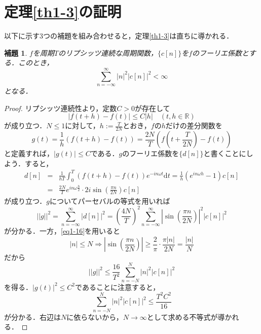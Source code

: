 \documentclass[a4j]{jsbook}
\newtheorem{lemma}[theorem]{補題}
\numberwithin{theorem}{chapter}  %
\begin{document}
\section{定理\ref{th1-3}の証明} \label{sec1-10}
以下に示す3つの補題を組み合わせると，定理\ref{th1-3}は直ちに導かれる．
\begin{lemma}
\label{lem1-10}
\(f\)を周期\(T\)のリプシッツ連続な周期関数，\(\{c[n]\}\)を\(f\)のフーリエ係数とする．このとき，
\begin{equation*}
    \sum_{n=-\infty}^\infty|n|^2\left|c[n]\right|^2<\infty
\end{equation*}
となる．
\end{lemma}
\begin{proof}
リプシッツ連続性より，定数\(C>0\)が存在して
\begin{equation*}
    |f(t+h)-f(t)|\leq C|h|\quad (t, h\in\mathbb{R})
\end{equation*}
が成り立つ．\(N\leq 1\)に対して，\(\displaystyle h:=\frac{T}{2N}\)とおき，\(f\)の\(h\)だけの差分関数を
\begin{equation*}
    g(t)=\frac{1}{h}(f(t+h)-f(t))=\frac{2N}{T}\left(f\left(t+\frac{T}{2N}\right)-f(t)\right)
\end{equation*}
と定義すれば，\(|g(t)|\leq C\)である．\(g\)のフーリエ係数を\(\{d[n]\}\)と書くことにしよう．すると，
\begin{eqnarray*}
d[n]&=&\frac{1}{hT}\int_0^T (f(t+h)-f(t))e^{-in\omega t}\mathrm{d}t=\frac{1}{h}(e^{in\omega h}-1)c[n] \\
&=&\frac{2N}{T}e^{in\omega\frac{h}{2}}\cdot 2i\sin\left(\frac{\pi n}{2N}\right)c[n]
\end{eqnarray*}
が成り立つ．\(g\)についてパーセバルの等式を用いれば
\begin{equation*}
    ||g||^2=\sum_{n=-\infty}^\infty\left|d[n]\right|^2=\left(\frac{4N}{T}\right)^2\sum_{n=-\infty}^\infty \left|\sin\left(\frac{\pi n}{2N}\right)\right|^2\left|c[n]\right|^2
\end{equation*}
が分かる．一方，\eqref{eq1-16}を用いると
\begin{equation*}
    |n|\leq N \Rightarrow \left|\sin\left(\frac{\pi n}{2N}\right)\right|\geq\frac{2}{\pi}\cdot\frac{\pi|n|}{2N}=\frac{|n|}{N}
\end{equation*}
だから
\begin{equation*}
    ||g||^2\leq\frac{16}{T^2}\sum_{n=-N}^N |n|^2\left|c[n]\right|^2
\end{equation*}
を得る．\(|g(t)|^2\leq C^2\)であることに注意すると，
\begin{equation*}
    \sum_{n=-N}^N |n|^2\left|c[n]\right|^2\leq\frac{T^2C^2}{16}
\end{equation*}
が分かる．右辺は\(N\)に依らないから，\(N\to\infty\)として求める不等式が導かれる．
\end{proof}
\end{document}
